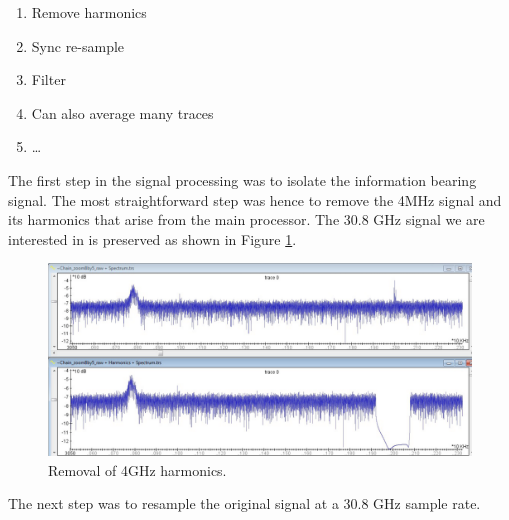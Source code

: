 \begin{enumerate}
  \item Remove harmonics
  \item Sync re-sample
  \item Filter
  \item Can also average many traces
  \item \ldots
\end{enumerate}

The first step in the signal processing was to isolate the information bearing signal. The most straightforward step was hence to remove the 4MHz signal and its harmonics that arise from the main processor. The 30.8 GHz signal we are interested in is preserved as shown in Figure \ref{figure:harmonics_removal}.

    \begin{figure}
      \centering
      \includegraphics[scale=0.38]{img/harmonics_removal.png}
      \caption{\label{figure:harmonics_removal}Removal of 4GHz harmonics.}
    \end{figure}  

The next step was to resample the original signal at a 30.8 GHz sample rate.
